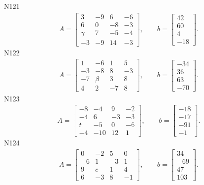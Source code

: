 \documentclass[11pt]{report}
\begin{document}
N121
\begin{align*}
 A = \left[\begin{matrix}3 & -9 & 6 & -6\\6 & 0 & -8 & -3\\\gamma & 7 & -5 & -4\\-3 & -9 & 14 & -3\end{matrix}\right],
\qquad b = \left[\begin{matrix}42\\60\\4\\-18\end{matrix}\right]. 
 \end{align*}
N122
\begin{align*}
 A = \left[\begin{matrix}1 & -6 & 1 & 5\\-3 & -8 & 8 & -3\\-7 & \beta & 3 & 8\\4 & 2 & -7 & 8\end{matrix}\right],
\qquad b = \left[\begin{matrix}-34\\36\\63\\-70\end{matrix}\right]. 
 \end{align*}
N123
\begin{align*}
 A = \left[\begin{matrix}-8 & -4 & 9 & -2\\-4 & 6 & -3 & -3\\t & -5 & 0 & -6\\-4 & -10 & 12 & 1\end{matrix}\right],
\qquad b = \left[\begin{matrix}-18\\-17\\-91\\-1\end{matrix}\right]. 
 \end{align*}
N124
\begin{align*}
 A = \left[\begin{matrix}0 & -2 & 5 & 0\\-6 & 1 & -3 & 1\\9 & c & 1 & 4\\6 & -3 & 8 & -1\end{matrix}\right],
\qquad b = \left[\begin{matrix}34\\-69\\47\\103\end{matrix}\right]. 
 \end{align*}
\end{document}
